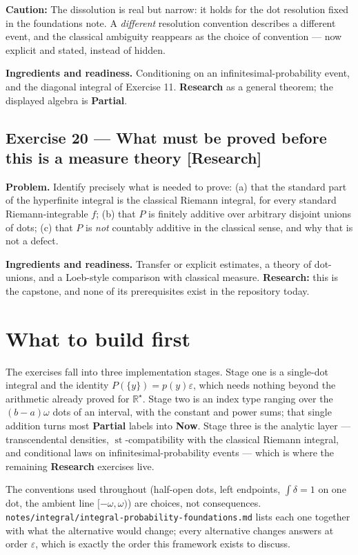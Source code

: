 \documentclass[11pt]{article}
\newcommand{\Rstar}{\mathbb{R}^{\star}}
\newcommand{\eps}{\varepsilon}
\newcommand{\st}{\operatorname{st}}
\begin{document}
\textbf{Caution:} The dissolution is real but narrow: it holds for the dot resolution fixed
in the foundations note. A \emph{different} resolution convention describes a
different event, and the classical ambiguity reappears as the choice of
convention --- now explicit and stated, instead of hidden.

\textbf{Ingredients and readiness.} Conditioning on an infinitesimal-probability
event, and the diagonal integral of Exercise 11. \textbf{Research} as a general
theorem; the displayed algebra is \textbf{Partial}.


\subsection*{Exercise 20 --- What must be proved before this is a measure theory \hfill \normalfont\small[Research]}

\textbf{Problem.} Identify precisely what is needed to prove: (a) that the standard
part of the hyperfinite integral is the classical Riemann integral, for every
standard Riemann-integrable $f$; (b) that $P$ is finitely additive over arbitrary disjoint unions of dots;
(c) that $P$ is \emph{not} countably additive in the classical sense, and why that
is not a defect.

\textbf{Ingredients and readiness.} Transfer or explicit estimates, a theory of
dot-unions, and a Loeb-style comparison with classical measure.
\textbf{Research:} this is the capstone, and none of its prerequisites exist in the
repository today.


\section*{What to build first}

The exercises fall into three implementation stages. Stage one is a
single-dot integral and the identity $P(\{y\})=p(y)\eps$, which needs nothing
beyond the arithmetic already proved for $\Rstar$. Stage two is an index type
ranging over the $(b-a)\omega$ dots of an interval, with the constant and
power sums; that single addition turns most \textbf{Partial} labels into
\textbf{Now}. Stage three is the analytic layer --- transcendental densities,
$\st$-compatibility with the classical Riemann integral, and conditional laws
on infinitesimal-probability events --- which is where the remaining
\textbf{Research} exercises live.

The conventions used throughout (half-open dots, left endpoints,
$\int\delta = 1$ on one dot, the ambient line $[-\omega,\omega)$) are choices,
not consequences. \texttt{notes/integral/integral-probability-foundations.md}
lists each one together with what the alternative would change; every
alternative changes answers at order $\eps$, which is exactly the order this
framework exists to discuss.
\end{document}
